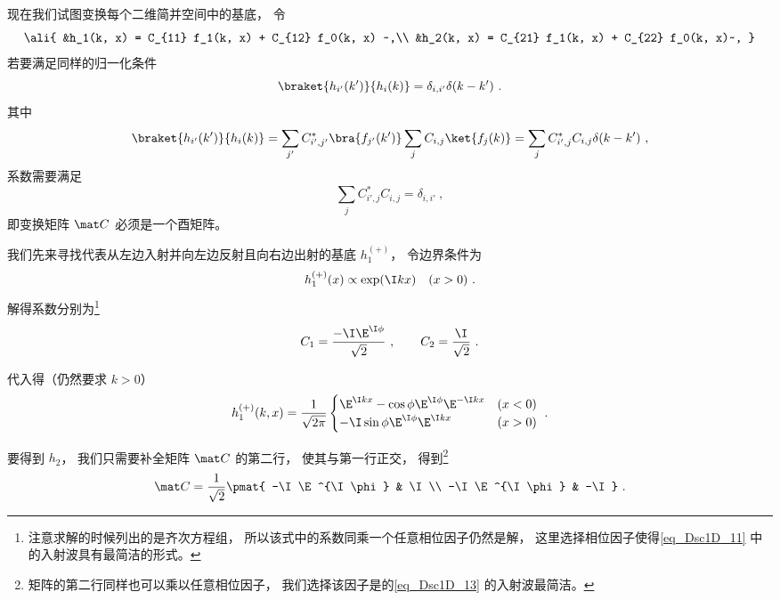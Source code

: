 现在我们试图变换每个二维简并空间中的基底， 令
\begin{equation}\ali{
&h_1(k, x) =  C_{11} f_1(k, x) + C_{12} f_0(k, x) ~,\\
&h_2(k, x) =  C_{21} f_1(k, x) + C_{22} f_0(k, x)~,
}\end{equation}
若要满足同样的归一化条件
\begin{equation}\label{eq_Dsc1D_6}
\braket{h_{i'}(k')}{h_i(k)} = \delta_{i,i'}\delta(k - k')~.
\end{equation}
其中
\begin{equation}
\braket{h_{i'}(k')}{h_i(k)} = \sum_{j'} C_{i',j'}^* \bra{f_{j'}(k')} \sum_j C_{i, j} \ket{f_j(k)} = \sum_j C_{i', j}^* C_{i, j} \delta(k - k')~,
\end{equation}
系数需要满足
\begin{equation}
 \sum_j C_{i', j}^* C_{i, j} = \delta_{i, i'}~,
\end{equation}
即变换矩阵 $\mat C$ 必须是一个酉矩阵。

我们先来寻找代表从左边入射并向左边反射且向右边出射的基底 $h_1^{(+)}$， 令边界条件为
\begin{equation}
h_1^{(+)}(x) \propto \exp(\I k x) \quad (x > 0)~.
\end{equation}
解得系数分别为\footnote{注意求解的时候列出的是齐次方程组， 所以该式中的系数同乘一个任意相位因子仍然是解， 这里选择相位因子使得\autoref{eq_Dsc1D_11} 中的入射波具有最简洁的形式。}
\begin{equation}
C_1 = \frac{-\I\E^{\I \phi}}{\sqrt{2}}~, \qquad
C_2 =  \frac{\I}{\sqrt{2}}~.
\end{equation}

代入得（仍然要求 $k > 0$）
\begin{equation}\label{eq_Dsc1D_11}
h_1^{(+)}(k, x) =  \frac{1}{\sqrt{2\pi}}
\begin{cases}
\E^{\I kx} - \cos\phi \E^{\I\phi} \E^{-\I k x} & (x < 0) \\
-\I\sin\phi\E^{\I\phi} \E^{\I kx}  & (x > 0)
\end{cases}~.
\end{equation}

要得到 $h_2$， 我们只需要补全矩阵 $\mat C$ 的第二行， 使其与第一行正交， 得到\footnote{矩阵的第二行同样也可以乘以任意相位因子， 我们选择该因子是的\autoref{eq_Dsc1D_13} 的入射波最简洁。}
\begin{equation}
\mat C = \frac{1}{\sqrt{2}}\pmat{
-\I\E^{\I \phi} & \I \\
-\I\E^{\I \phi} & -\I
}~.\end{equation}

